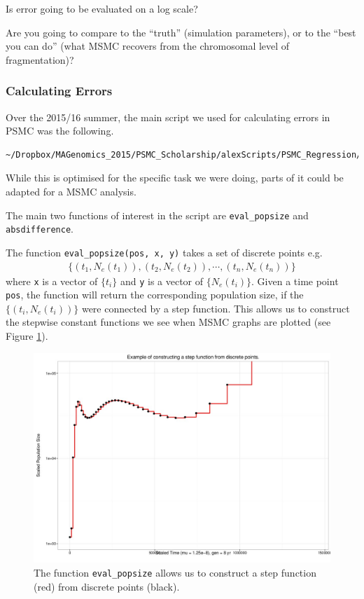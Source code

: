 \documentclass[11pt,a4paper]{article}
\begin{document}
Is error going to be evaluated on a log scale?

Are you going to compare to the ``truth'' (simulation parameters), or to the ``best you can do'' (what MSMC recovers from the chromosomal level of fragmentation)?

\subsubsection{Calculating Errors}
Over the 2015/16 summer, the main script we used for calculating errors in PSMC was the following.
\begin{lstlisting}
~/Dropbox/MAGenomics_2015/PSMC_Scholarship/alexScripts/PSMC_Regression/StringExtraction_ErrorAnalysis.R
\end{lstlisting}
While this is optimised for the specific task we were doing, parts of it could be adapted for a MSMC analysis.

The main two functions of interest in the script are \texttt{eval\_popsize} and \texttt{absdifference}.

The function \texttt{eval\_popsize(pos, x, y)} takes a set of discrete points e.g. 
\begin{eqnarray*}
\{(t_1, N_{e}(t_1)), (t_2, N_{e}(t_2)), \cdots,(t_n, N_{e}(t_n))\}
\end{eqnarray*}
where \texttt{x} is a vector of $\{t_i\}$ and \texttt{y} is a vector of $\{N_e(t_i)\}$. Given a time point \texttt{pos}, the function will return the corresponding population size, if the $\{(t_i,N_e(t_i)) \}$ were connected by a step function. This allows us to construct the stepwise constant functions we see when MSMC graphs are plotted (see Figure \ref{pointsToStep}).

\begin{figure}
\centering
\includegraphics[width=1\textwidth]{pix/pointsToStep}
\caption{The function \texttt{eval\_popsize} allows us to construct a step function (red) from discrete points (black).} \label{pointsToStep}
\end{figure}
\end{document}
